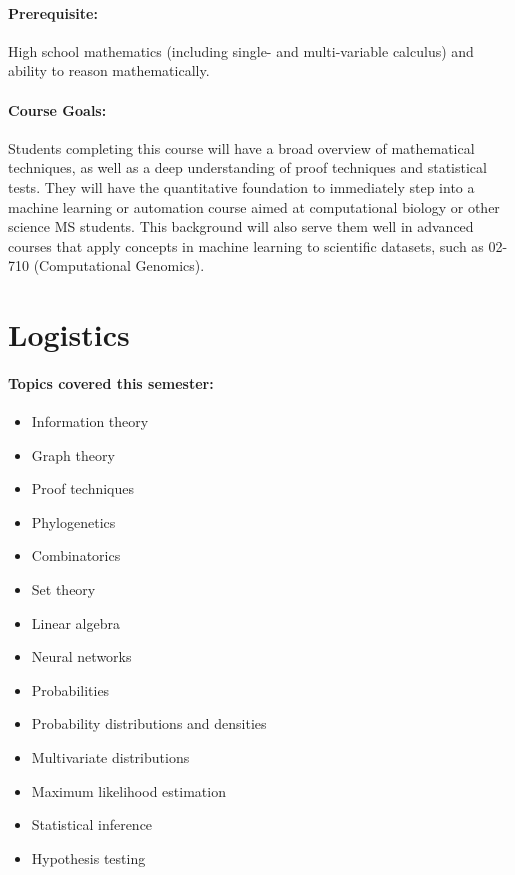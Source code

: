 \documentclass[12pt]{scrartcl}
\begin{document}

\paragraph{Prerequisite:} 
High school mathematics (including single- and multi-variable calculus) and ability to reason mathematically.

\paragraph{Course Goals:} 
Students completing this course will have a broad overview of mathematical techniques, 
as well as a deep understanding of proof techniques and statistical tests. 
They will have the quantitative foundation to immediately step into a machine learning or 
automation course aimed at computational biology or other science MS students. 
This background will also serve them well in advanced courses that apply concepts in machine learning 
to scientific datasets, such as 02-710 (Computational Genomics).

\clearpage
\tableofcontents





\clearpage
\section{Logistics}
\paragraph{Topics covered this semester:}
\begin{itemize}
\item Information theory
\item Graph theory
\item Proof techniques
\item Phylogenetics
\item Combinatorics
\item Set theory
\item Linear algebra
\item Neural networks
\item Probabilities
\item Probability distributions and densities
\item Multivariate distributions
\item Maximum likelihood estimation
\item Statistical inference
\item Hypothesis testing
\end{itemize}
\end{document}
